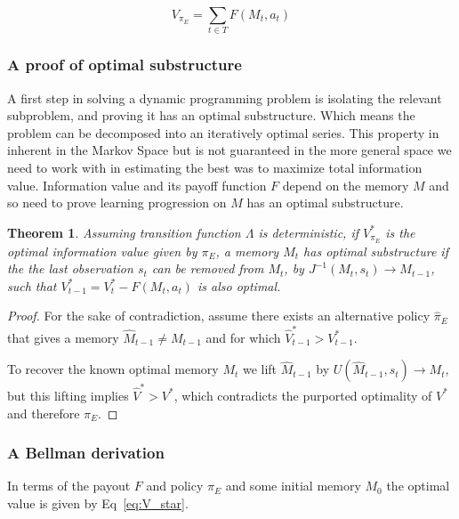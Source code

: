 \documentclass[9pt,twocolumn,twoside]{pnas-new}
\newtheorem{theorem}{Theorem}
\begin{document}
\begin{equation} \label{eq:V}
    V_{\pi_E} = \sum_{t \in T} F(M_t, a_t)
\end{equation}

\subsubsection*{A proof of optimal substructure}
A first step in solving a dynamic programming problem is isolating the relevant subproblem, and proving it has an optimal substructure. Which means the problem can be decomposed into an iteratively optimal series. This property in inherent in the Markov Space %
but is not guaranteed in the more general space we need to work with in estimating the best was to maximize total information value. Information value and its payoff function $F$ depend on the memory $M$ and so need to prove learning progression on $M$ has an optimal substructure.

\begin{theorem} \label{theorem:opt_sub}
    Assuming transition function $\Lambda$ is deterministic, if $V^*_{\pi_E}$ is the optimal information value given by $\pi_E$, a memory $M_t$ has optimal substructure if the the last observation $s_t$ can be removed from $M_t$, by $J^{-1}(M_t, s_t) \rightarrow M_{t-1}$, such that $V^*_{t-1} = V^*_t - F(M_t, a_t)$ is also optimal. 
\end{theorem}
\begin{proof}
    For the sake of contradiction, assume there exists an alternative policy $\hat \pi_E$ that gives a memory $\hat M_{t-1} \neq M_{t-1}$ and for which $\hat V^*_{t-1} > V^*_{t-1}$. 

    To recover the known optimal memory $M_t$ we lift $\hat M_{t-1}$ by $U(\hat M_{t-1}, s_t) \rightarrow M_t$, but this lifting implies $\hat V^* > V^*$, which contradicts the purported optimality of $V^*$ and therefore $\pi_E$.
\end{proof}


\subsubsection*{A Bellman derivation}
In terms of the payout $F$ and policy $\pi_E$ and some initial memory $M_0$ the optimal value is given by Eq~\ref{eq:V_star}.
\end{document}
